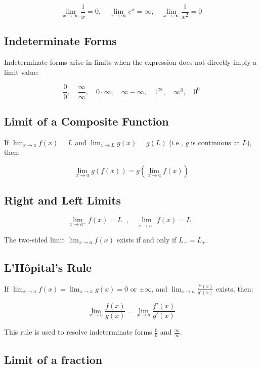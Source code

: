 \[
    \lim_{x \to \infty} \frac{1}{x} = 0, \quad \lim_{x \to \infty} e^x = \infty, \quad \lim_{x \to \infty} \frac{1}{x^2} = 0
\]

\subsection{Indeterminate Forms}

Indeterminate forms arise in limits when the expression does not directly imply a limit value:

\[
    \frac{0}{0}, \quad \frac{\infty}{\infty}, \quad 0 \cdot \infty, \quad \infty - \infty, \quad 1^\infty, \quad \infty^0, \quad 0^0
\]

\subsection{Limit of a Composite Function}

If \(\displaystyle \lim_{x \to a} f(x) = L\) and \(\displaystyle \lim_{x \to L} g(x) = g(L)\) 
(i.e., \emph{g} is continuous at \(L\)), then:

\[
    \lim_{x \to a} g(f(x)) = g\left(\lim_{x \to a} f(x)\right)
\]

\subsection{Right and Left Limits}

\[
    \lim_{x \to a^-} f(x) = L_-, \quad \lim_{x \to a^+} f(x) = L_+
\]

The two-sided limit \(\displaystyle \lim_{x \to a} f(x)\) exists if and only if \(L_- = L_+\).

\subsection{L’Hôpital’s Rule}

If \(\displaystyle \lim_{x \to a} f(x) = \lim_{x \to a} g(x) = 0\) or \(\pm\infty\), and \(\displaystyle \lim_{x \to a} \frac{f'(x)}{g'(x)}\) exists, then:

\[
    \lim_{x \to a} \frac{f(x)}{g(x)} = \lim_{x \to a} \frac{f'(x)}{g'(x)}
\]

This rule is used to resolve indeterminate forms \(\frac{0}{0}\) and \(\frac{\infty}{\infty}\).

\subsection{Limit of a fraction}

